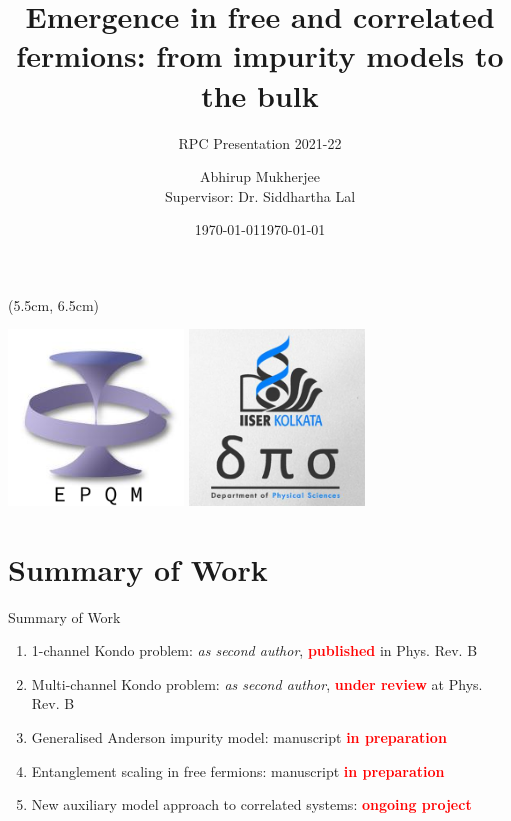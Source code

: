 \documentclass[11pt,aspectratio=169]{beamer}
\title{Emergence in free and correlated fermions: from impurity models to the bulk}
\subtitle{RPC Presentation 2021-22}
\date{\today}
\author{Abhirup Mukherjee\\Supervisor: Dr. Siddhartha Lal}
\institute{Department of Physical Sciences, IISER Kolkata, Mohanpur}
\date{\today}
\newcommand{\focus}[1]{\textcolor{red}{\bf{#1}}}
\begin{document}
\centering

\begin{frame}
\maketitle
\begin{textblock*}{0.4\textwidth}(5.5cm, 6.5cm)
	\centering
	\vspace*{\fill}

	\includegraphics[width=0.35\textwidth]{figures/epqm_logo_mod.jpeg}
	\hspace*{\fill}
	\includegraphics[width=0.35\textwidth]{figures/dps_logo.jpeg}

	\vspace*{\fill}
\end{textblock*}
\end{frame}

\section{Summary of Work}

\begin{frame}{Summary of Work}
\begin{enumerate}
\item 1-channel Kondo problem: {\it as second author}, \focus{published} in Phys. Rev. B\\[20pt]
	\item Multi-channel Kondo problem: {\it as second author}, \focus{under review} at Phys. Rev. B\\[20pt]
	\item Generalised Anderson impurity model: manuscript \focus{in preparation}\\[20pt]
	\item Entanglement scaling in free fermions: manuscript \focus{in preparation}\\[20pt]
	\item New auxiliary model approach to correlated systems: \focus{ongoing project}
\end{enumerate}

\end{frame}
\end{document}
